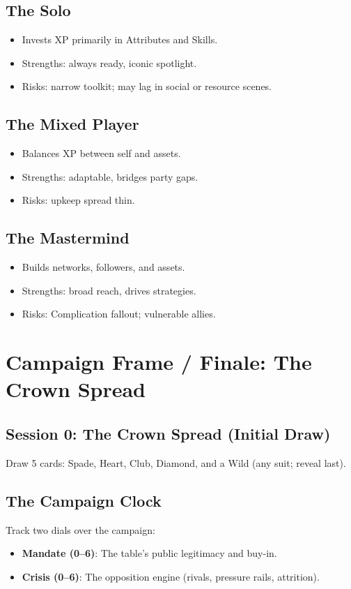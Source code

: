 \documentclass[11pt]{article}
\begin{document}
\subsection{The Solo}
\begin{itemize}
    \item Invests XP primarily in Attributes and Skills.
    \item Strengths: always ready, iconic spotlight.
    \item Risks: narrow toolkit; may lag in social or resource scenes.
\end{itemize}

\subsection{The Mixed Player}
\begin{itemize}
    \item Balances XP between self and assets.
    \item Strengths: adaptable, bridges party gaps.
    \item Risks: upkeep spread thin.
\end{itemize}

\subsection{The Mastermind}
\begin{itemize}
    \item Builds networks, followers, and assets.
    \item Strengths: broad reach, drives strategies.
    \item Risks: Complication fallout; vulnerable allies.
\end{itemize}

\section{Campaign Frame / Finale: The Crown Spread}

\subsection{Session 0: The Crown Spread (Initial Draw)}
Draw 5 cards: Spade, Heart, Club, Diamond, and a Wild (any suit; reveal last).

\subsection{The Campaign Clock}
Track two dials over the campaign:
\begin{itemize}
    \item \textbf{Mandate (0–6)}: The table's public legitimacy and buy-in.
    \item \textbf{Crisis (0–6)}: The opposition engine (rivals, pressure rails, attrition).
\end{itemize}
\end{document}

